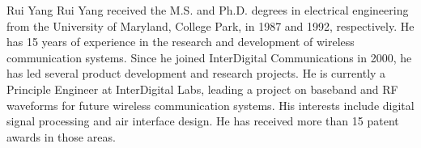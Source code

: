 \documentclass[journal,final,letterpaper,10pt,doublecolumn,twoside]{IEEEtran}
\begin{document}
\begin{IEEEbiography}{Rui Yang}
Rui Yang received the M.S. and Ph.D. degrees in electrical engineering from the University of Maryland, College Park, in 1987 and 1992, respectively. He has 15 years of experience in the research and development of wireless communication systems. Since he joined InterDigital Communications in 2000, he has led several product development and research projects. He is currently a Principle Engineer at InterDigital Labs, leading a project on baseband and RF waveforms for future wireless communication systems. His interests include digital signal processing and air interface design. He has received more than 15 patent awards in those areas.
\end{IEEEbiography}
\end{document}
